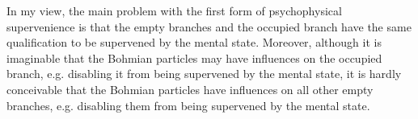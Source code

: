 In my view, the main problem with the first form of psychophysical supervenience is that the empty branches and the occupied branch have the same qualification to be supervened by the mental state.
Moreover, although it is imaginable that the Bohmian particles may have influences on the occupied branch, e.g. disabling it from being supervened by the mental state, it is hardly conceivable that the Bohmian particles have influences on all other empty branches, e.g. disabling them from being supervened by the mental state. 

